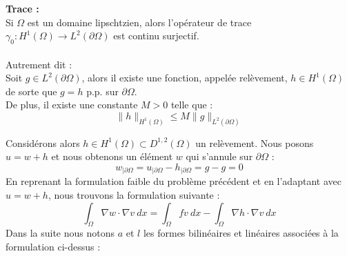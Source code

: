 \begin{theorembox}
\begin{theorem}
    \textbf{Trace \cite{Strongly} :}\\
    Si $\Omega$ est un domaine lipschtzien, alors l'opérateur de trace $\gamma_0 : H^1(\Omega) \to L^2(\partial \Omega) $ est continu surjectif. \\
    \\
    Autrement dit :\\
    Soit $g \in L^2(\partial \Omega)$, alors il existe une fonction, appelée relèvement, $h \in H^1(\Omega)$ de sorte que $g = h$ p.p. sur $\partial \Omega$.\\
    De plus, il existe une constante $M > 0$ telle que :
    $$ \|h\|_{H^1(\Omega)} \leq M\|g\|_{L^2(\partial \Omega)}$$
\end{theorem}
\end{theorembox}
Considérons alors $h \in H^1(\Omega) \subset D^{1,2}(\Omega)$ un relèvement. Nous posons $u = w + h$ et nous obtenons un élément $w$ qui s'annule sur $\partial \Omega$ :
$$ w_{|\partial \Omega} = u_{|\partial \Omega} - h_{|\partial \Omega} = g - g = 0 $$
En reprenant la formulation faible du problème précédent et en l'adaptant avec $u = w + h$, nous trouvons la formulation suivante :
$$ \int_{\Omega} \nabla w \cdot \nabla v \ dx = \int_{\Omega} fv \ dx - \int_{\Omega} \nabla h \cdot \nabla v \ dx  $$
Dans la suite nous notons $a$ et $l$ les formes bilinéaires et linéaires associées à la formulation ci-dessus :
